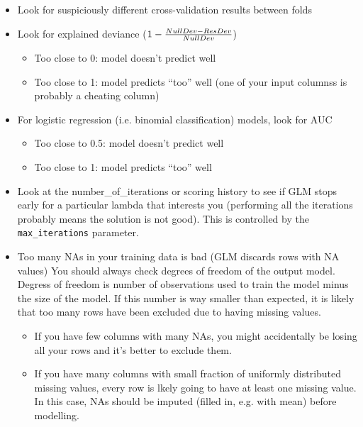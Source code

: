 \begin{itemize}
\item Look for suspiciously different cross-validation results between folds

\waterExampleInR


\item Look for explained deviance ($1 - {NullDev - ResDev \over NullDev}$)  
      \begin{itemize}
      \item Too close to 0:  model doesn’t predict well
      \item Too close to 1:  model predicts “too” well (one of your input columnss is probably a cheating column)
      \end{itemize}
\item For logistic regression (i.e. binomial classification) models, look for AUC
      \begin{itemize}
      \item Too close to 0.5:  model doesn’t predict well
      \item Too close to 1:  model predicts “too” well
      \end{itemize}
\item Look at the number\_of\_iterations or scoring history to see if GLM stops early for a particular
      lambda that interests you (performing all the iterations probably means the solution is not good).  This is
      controlled by the \texttt{max\_iterations} parameter.
\item Too many NAs in your training data is bad (GLM discards rows with NA values)
     You should always check degrees of freedom of the output model. Degress of freedom is number of observations used to train the model minus the size of the model. If this number is way smaller than expected, it is likely that too many rows have been excluded due to having missing values. 

      \begin{itemize}
      \item If you have few columns with many NAs, you might accidentally be losing all your rows and it's better to exclude them.
      \item If you have many columns with small fraction of uniformly distributed missing values, every row is lkely going to have at least one missing value. In this case, NAs should be imputed (filled in, e.g. with mean) before modelling.
      \end{itemize}
\end{itemize}

